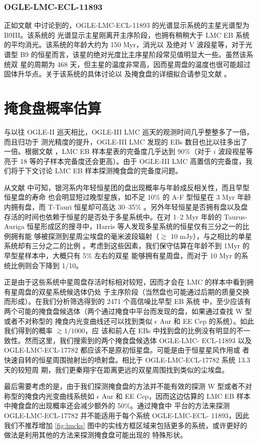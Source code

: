 \subsubsection{OGLE-LMC-ECL-11893} \label{sec:lmc11893}

正如文献  中讨论到的，OGLE-LMC-ECL-11893 的光谱显示系统的主星光谱型为 B9III。该系统的
光谱显示主星刚离开主序阶段，也拥有稍稍大于 LMC EB 系统的平均消光。该系统的年龄大约为 150 Myr，消光以
及绝对 V 波段星等，对于光谱型 B9 的恒星而言，该星的绝对光度比主序星阶段常见值明显大一些。虽然该系统双
星的周期为 468 天，但主星的温度非常高，因而星周盘的温度也很可能超过固体升华点。关于该系统的具体讨论以
及掩食盘的详细拟合请参见文献 。


\section{掩食盘概率估算} \label{sec:discebdiscuz}

与以往 OGLE-II 巡天\cite{Wyrzykowski2003}相比，OGLE-III LMC 巡天的观测时间几乎整整多了一倍，而且归功于
测光精度的提升，OGLE-III LMC 发现的 EBs 数目也比以往多出了一倍。根据文献 ，LMC EB 
样本星表的完备度几乎达到 90\%（对于 $i$ 波段视星等亮于 18 等的子样本完备度还会更高）。由于 OGLE-III 
LMC 高置信的完备度，我们将于下文讨论 LMC EB 样本探测掩食盘的完备度问题。

从文献  中可知，银河系内年轻恒星团的盘出现概率与年龄成反相关性，而且早型恒星盘的寿命
也会明显短过晚型星族，如不足 10\% 的 A-F 型恒星在 3 Myr 年龄内拥有盘，而 T-Tauri 恒星却可高达 30--35\%
\cite{Hernandez2007}。另外年轻恒星是否拥有盘以及盘存活的时间也依赖于恒星的是否处于多星系统中。在对 
1--2 Myr 年龄的 Taurus-Auriga 恒星形成区的搜寻中，Harris 等人发现多星系统的恒星仅有三分之一的比例拥有能
够被探测到星周尘埃盘的毫米波段辐射（$\gtrsim$ 10 mJy），与之相比的单星系统却有三分之二的比例
\cite{Harris2012}。考虑到这些因素，我们保守估算在年龄不到 1Myr 的早型星样本中，大概只有 5\% 左右的双星
能够拥有星周盘，而对于 10 Myr 的系统比例则会下降到 1/10。

正是由于这些系统中星周盘存活时标相对较短，因而才会在 LMC 的样本中看到拥有星周盘的双星系统候选体仍处
于主序阶段（当然盘也可能通过后期的质量交换而形成）。在我们分析筛选得到的 2471 个高信噪比早型 EB 系统
中，至少应该有两个可能的掩食盘候选体（两个通过掩食中平台而发现的盘，如果通过查找 W 型或者不对称型的
掩食内光变曲线还可以找到类似 $\epsilon$ Aur 和 EE Cep 的系统）。如此我们得到的概率 $\gtrsim 1/1000$，应
该和前人在 EBs 中找到盘的比例没有明显的不一致性。然而这里，我们搜索到的两个掩食盘候选体 OGLE-LMC-
ECL-11893 以及 OGLE-LMC-ECL-17782 都应该不是原初恒星盘。可能是由于恒星星风作用\cite{Graczyk2011}或
者快速自转的恒星周围抛射出的喷射盘\cite{Rivinius2013}。相比于 OGLE-LMC-ECL-17782 系统 13.3 天的较短周
期，我们更秦翔宇在距离更远的双星周围找到类似的尘埃盘。

最后需要考虑的是，由于我们探测掩食盘的方法并不能有效的探测  W 型或者不对称型的掩食内光变曲线系统如 $
\epsilon$ Aur 和 EE Cep，因而这边估算的 LMC EB 样本中掩食盘的出现概率还会减少额外的 50\%。通过掩食中
平台的方法来探测 OGLE-LMC-ECL-17782 并不能适用于每个系统 OGLE-LMC-ECL- 11893，因此我们不推荐增加 
\ref{fig:lmcks} 图中的实线方框区域来包括更多的系统，或许更好的做法是利用其他的方法来探测掩食盘可能出现的
特殊形状。



